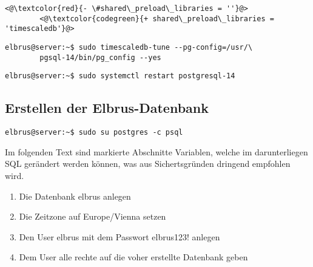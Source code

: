 	\lstset{style=files}
	\begin{lstlisting}[caption={/var/lib/pgsql/14/data/postgresql.conf - Ändern der folgenden Zeilen.}, numbers=none]
		<@\textcolor{red}{- \#shared\_preload\_libraries = ''}@>
		<@\textcolor{codegreen}{+ shared\_preload\_libraries = 'timescaledb'}@>
	\end{lstlisting}
	
	
	
	\lstset{style=commands}
	\begin{lstlisting}[caption={Anpassen der Datenbank Einstellungen auf die Server Hardware.}]
		elbrus@server:~$ sudo timescaledb-tune --pg-config=/usr/\
		pgsql-14/bin/pg_config --yes
	\end{lstlisting}
	
	\lstset{style=commands}
	\begin{lstlisting}[caption={Neustarten des Services um Änderungen zu übernehmen.}]
		elbrus@server:~$ sudo systemctl restart postgresql-14
	\end{lstlisting}
	\newpage
	
	\subsection{Erstellen der Elbrus-Datenbank}
	
	\lstset{style=commands}
	\begin{lstlisting}[caption={Verbinden mit dem interaktiven Terminal von 'postgres'.}]
		elbrus@server:~$ sudo su postgres -c psql
	\end{lstlisting}
	Im folgenden Text sind markierte Abschnitte Variablen, welche im darunterliegen SQL gerändert werden können, was aus Sichertsgründen dringend empfohlen wird.
	\begin{enumerate}
		\item Die Datenbank elbrus anlegen
		\item Die Zeitzone auf Europe/Vienna setzen
		\item Den User elbrus mit dem Passwort elbrus123! anlegen
		\item Dem User alle rechte auf die voher erstellte Datenbank geben
	\end{enumerate}	
	
